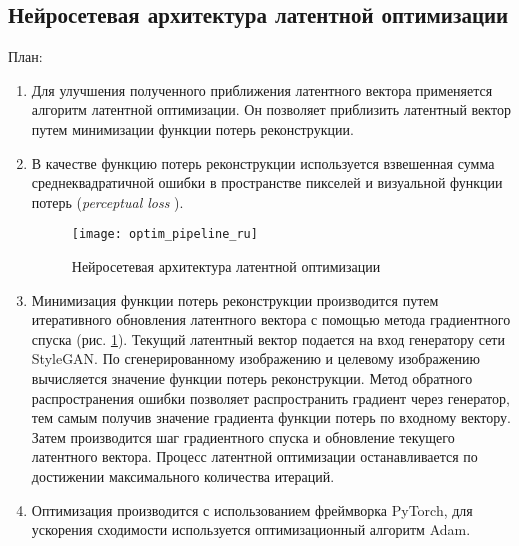 \subsection{Нейросетевая архитектура латентной оптимизации}
План:
\begin{enumerate}

\item 
Для улучшения полученного приближения латентного вектора применяется алгоритм латентной оптимизации. Он позволяет приблизить латентный вектор путем минимизации функции потерь реконструкции.

\item 
В качестве функцию потерь реконструкции используется взвешенная сумма среднеквадратичной ошибки в пространстве пикселей и визуальной функции потерь (\emph{perceptual loss} \cite{Johnson2016Perceptual}).

\begin{figure}[h]
\begin{center}
    \texttt{[image: optim\_pipeline\_ru]}
    \caption{Нейросетевая архитектура латентной оптимизации}
    \label{fig:optim_pipeline}
\end{center}
\end{figure}

\item 
Минимизация функции потерь реконструкции производится путем итеративного обновления латентного вектора с помощью метода градиентного спуска (рис. \ref{fig:optim_pipeline}).
Текущий латентный вектор подается на вход генератору сети StyleGAN.
По сгенерированному изображению и целевому изображению вычисляется значение функции потерь реконструкции. Метод обратного распространения ошибки позволяет распространить градиент через генератор, тем самым получив значение градиента функции потерь по входному вектору. Затем производится шаг градиентного спуска и обновление текущего латентного вектора.
Процесс латентной оптимизации останавливается по достижении максимального количества итераций.


\item 
Оптимизация производится с использованием фреймворка PyTorch, для ускорения сходимости используется оптимизационный алгоритм Adam.

\end{enumerate}

